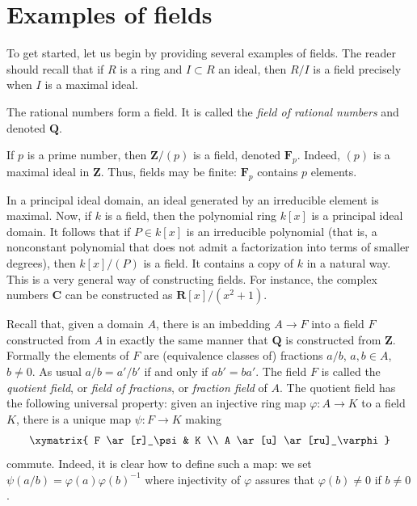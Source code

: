 \section{Examples of fields}
\label{section-examples}

\noindent
To get started, let us begin by providing several examples of fields. The
reader should recall that if $R$ is a ring and $I \subset R$ an
ideal, then $R/I$ is a field precisely when $I$ is a maximal ideal.

\begin{example}
\label{example-rational-numbers}
The rational numbers form a field. It is called the
{\it field of rational numbers} and denoted $\mathbf{Q}$.
\end{example}

\begin{example}
\label{example-prime-field}
If $p$ is a prime number, then $\mathbf{Z}/(p)$ is a field, denoted
$\mathbf{F}_p$. Indeed, $(p)$ is a
maximal ideal in $\mathbf{Z}$. Thus, fields may be finite: $\mathbf{F}_p$
contains $p$ elements.
\end{example}

\begin{example}
\label{example-quotient-polymial-ring}
In a principal ideal domain, an ideal generated by an irreducible element
is maximal. Now, if $k$ is a field, then the polynomial ring $k[x]$ is a
principal ideal domain. It follows that if $P \in k[x]$ is an irreducible
polynomial (that is, a nonconstant polynomial
that does not admit a factorization into terms of smaller degrees), then
$k[x]/(P)$ is a field. It contains a copy of $k$ in a natural way.
This is a very general way of constructing fields. For instance, the
complex numbers $\mathbf{C}$
can be constructed as $\mathbf{R}[x]/(x^2 + 1)$.
\end{example}

\begin{example}
\label{example-quotient-field}
Recall that, given a domain $A$, there is an imbedding $A \to F$ into a
field $F$ constructed from $A$ in exactly the same manner that
$\mathbf{Q}$ is constructed from $\mathbf{Z}$. Formally the elements
of $F$ are (equivalence classes of) fractions $a/b$,
$a, b \in A$, $b \not = 0$. As usual $a/b = a'/b'$ if and only if $ab' = ba'$.
The field $F$ is called the {\it quotient field}, or {\it field of fractions},
or {\it fraction field} of $A$.
The quotient field has the following universal property: given an
injective ring map $\varphi : A \to K$ to a field $K$, there is a unique
map $\psi : F \to K$ making
$$
\xymatrix{
F \ar[r]_\psi & K \\
A \ar[u] \ar[ru]_\varphi
}
$$
commute. Indeed, it is clear how to define such a map: we set
$\psi(a/b) = \varphi(a)\varphi(b)^{-1}$ where injectivity of $\varphi$
assures that $\varphi(b) \not = 0$ if $ b \not = 0$.
\end{example}

